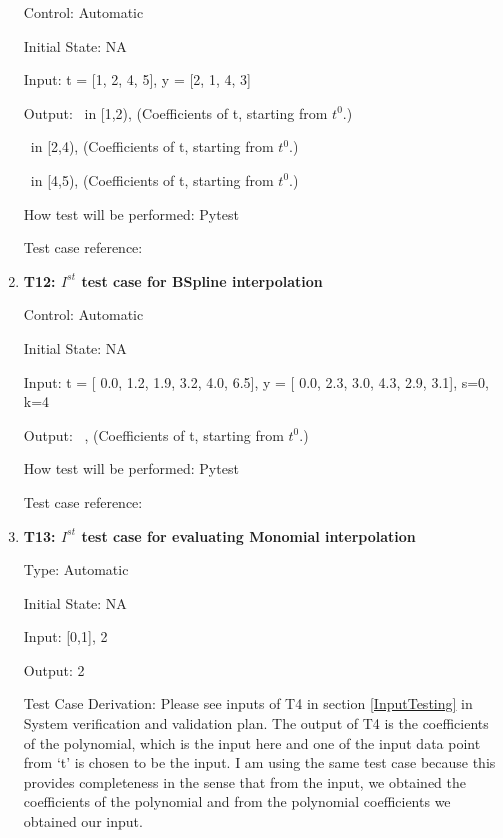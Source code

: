 \documentclass[12pt, titlepage]{article}
\begin{document}
\begin{enumerate}
Control: Automatic 

Initial State: NA

Input: t = [1, 2, 4, 5], y = [2, 1, 4, 3]

Output: 
~\newline [1.0,1.0, 1.38888889, 2.0] in [1,2), (Coefficients of t, starting from $t^{0}$.)

~\newline [4.0, 4.0, 1.0, 1.0] in [2,4), (Coefficients of t, starting from $t^{0}$.)

~\newline[3.0, 3.61111111, 4.0, 4.0] in [4,5), (Coefficients of t, starting from $t^{0}$.)

How test will be performed: Pytest

Test case reference: \cite{HermiteCubic2}\\

\item{\textbf{T12: $I^{st}$ test case for BSpline interpolation} \\}

Control: Automatic 

Initial State: NA

Input: t = [ 0.0, 1.2,  1.9,  3.2,  4.0,  6.5], y = [ 0.0,  2.3,  3.0,  4.3,  2.9,  3.1], s=0, k=4


Output: 
~\newline [-5.62048630e-18, 2.98780300e+00, -5.74472095e-01,  1.46700914e+01,
-1.03253068e+01,  3.10000000e+00,  0.00000000e+00,  0.00000000e+00,
0.00000000e+00,  0.00000000e+00,  0.00000000e+00], (Coefficients of t, starting from $t^{0}$.)

How test will be performed: Pytest

Test case reference: \cite{BSpline}



\item{\textbf{T13: $I^{st}$ test case for evaluating Monomial interpolation}}

Type: Automatic

Initial State: NA 

Input: [0,1], 2 

Output: 2

Test Case Derivation: Please see inputs of T4 in section \ref{InputTesting} in 
System verification and validation plan. The output of T4 is the coefficients 
of the polynomial, which is the input here and one of the input data point from 
`t' is chosen to be the input. I am using the same test case because this 
provides completeness in the sense that from the input, we obtained the 
coefficients of the polynomial and from the polynomial coefficients we obtained 
our input.


\end{enumerate}
\end{document}
